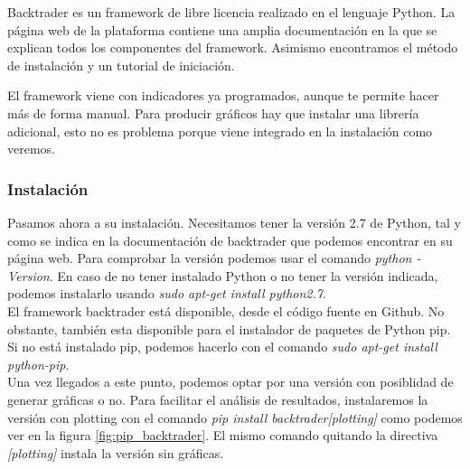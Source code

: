 \documentclass[12pt,a4paper]{article}
\begin{document}
		Backtrader es un framework de libre licencia realizado en el lenguaje Python. La p\'agina web de la plataforma\cite{backtraderweb} contiene una amplia documentaci\'on en la que se explican todos los componentes del framework. Asimismo encontramos el m\'etodo de instalaci\'on y un tutorial de iniciaci\'on.
		
		El framework viene con indicadores ya programados, aunque te permite hacer m\'as de forma manual. Para producir gr\'aficos hay que instalar una librer\'ia adicional, esto no es problema porque viene integrado en la instalaci\'on como veremos.\\
		
		
		\subsubsection{Instalaci\'on}
		
		Pasamos ahora a su instalaci\'on. Necesitamos tener la versi\'on 2.7 de Python, tal y como se indica en la documentaci\'on de backtrader\cite{backtraderdoc} que podemos encontrar en su p\'agina web. Para comprobar la versi\'on podemos usar el comando \textit{python -Version}. En caso de no tener instalado Python o no tener la versi\'on indicada, podemos instalarlo usando \textit{sudo apt-get install python2.7}.\\
		
		El framework backtrader est\'a disponible, desde el c\'odigo fuente en Github. No obstante, tambi\'en esta disponible para el instalador de paquetes de Python pip. Si no est\'a instalado pip, podemos hacerlo con el comando \textit{sudo apt-get install python-pip}.\\
		
		Una vez llegados a este punto, podemos optar por una versi\'on con posiblidad de generar gr\'aficas o no. Para facilitar el an\'alisis de resultados, instalaremos la versi\'on con plotting con el comando \textit{pip install backtrader[plotting]} como podemos ver en la figura \ref{fig:pip_backtrader}. El mismo comando quitando la directiva \textit{[plotting]} instala la versi\'on sin gr\'aficas.\\
		
\end{document}
